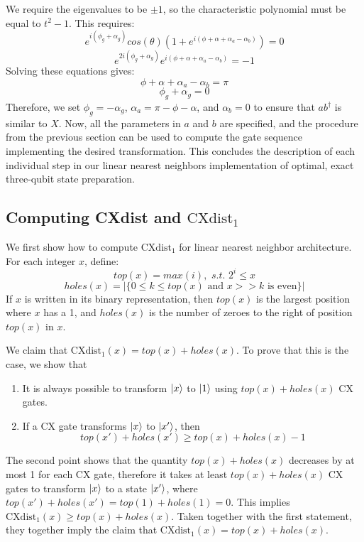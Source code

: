 \documentclass{article}
\begin{document}
We require the eigenvalues to be $\pm 1$, so the characteristic polynomial must
be equal to $t^2 - 1$. This requires:
$$e^{i(\phi_g + \alpha_g)}cos(\theta)(1 + e^{i(\phi + \alpha + \alpha_a - \alpha_b)}) = 0$$
$$e^{2i(\phi_g + \alpha_g)}e^{i(\phi + \alpha + \alpha_a - \alpha_b)} = -1$$
Solving these equations gives:
$$\phi + \alpha + \alpha_a - \alpha_b = \pi$$
$$\phi_g + \alpha_g = 0$$
Therefore, we set $\phi_g = -\alpha_g$, $\alpha_a = \pi - \phi - \alpha$, and
$\alpha_b = 0$ to ensure that $ab^\dagger$ is similar to $X$. Now, all the
parameters in $a$ and $b$ are specified, and the procedure from the previous
section can be used to compute the gate sequence implementing the desired
transformation. This concludes the description of each individual step in our
linear nearest neighbors implementation of optimal, exact three-qubit state
preparation.

\subsection{Computing CXdist and $\text{CXdist}_1$}
We first show how to compute $\text{CXdist}_1$ for linear nearest neighbor
architecture. For each integer $x$, define:
$$top(x) = max(i), \textit{ s.t. } 2^i \leq x$$
$$holes(x) = |\{0 \leq k \leq top(x) \text{ and } x >> k \text{ is even}\}|$$
If $x$ is written in its binary representation, then $top(x)$ is the largest
position where $x$ has a 1, and $holes(x)$ is the number of zeroes to the right
of position $top(x)$ in $x$.

We claim that $\text{CXdist}_1(x) = top(x) + holes(x)$. To prove that this is 
the case, we show that
\begin{enumerate}
    \item It is always possible to transform $\mathinner{|{x}\rangle}$ to $\mathinner{|{1}\rangle}$ using 
      $top(x) + holes(x)$ CX gates.
    \item If a CX gate transforms $\mathinner{|{x}\rangle}$ to $\mathinner{|{x'}\rangle}$, then
      $$top(x') + holes(x') \geq top(x) + holes(x) - 1$$
\end{enumerate}
The second point shows that the quantity $top(x) + holes(x)$ decreases by at
most 1 for each CX gate, therefore it takes at least $top(x) + holes(x)$ CX
gates to transform $\mathinner{|{x}\rangle}$ to a state $\mathinner{|{x'}\rangle}$, where 
$top(x') + holes(x') = top(1) + holes(1) = 0$. This implies 
$\text{CXdist}_1(x) \geq top(x) + holes(x)$. Taken together with the first
statement, they together imply the claim that 
$\text{CXdist}_1(x) = top(x) + holes(x)$.
\end{document}
